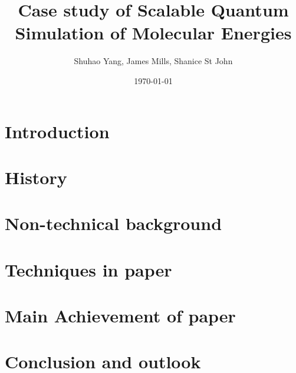 \documentclass[12pt]{article}
\begin{document}
\title{Case study of Scalable Quantum Simulation of Molecular Energies}
\author{Shuhao Yang, James Mills, Shanice St John}
\date{\today}
\maketitle
\section{Introduction}
\section{History}
\cite{trabesinger2012quantum}
\section{Non-technical background}
\section{Techniques in paper}
\cite{ryabinkin2018constrained}
\section{Main Achievement of paper}
\section{Conclusion and outlook}


\end{document}
